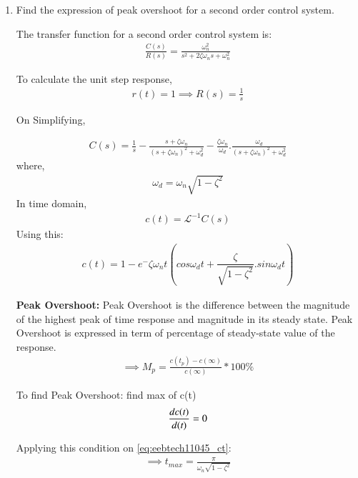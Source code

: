 \begin{enumerate}[label=\thesubsection.\arabic*.,ref=\thesubsection.\theenumi]

\item Find the expression of peak overshoot for a second order control system.

\solution

The transfer function for a second order control system is:
\begin{align}
    \frac{C(s)}{R(s)}= \frac{\omega_n^2}{s^2 + 2\zeta\omega_ns + \omega_n^2}
\end{align}

To calculate the unit step response,
\begin{align}
    r(t) = 1 \implies R(s) = \frac{1}{s}    
\end{align}

On Simplifying, 

\begin{align}
    C(s) = \frac{1}{s}-\frac{s+\zeta\omega_n}{(s + \zeta\omega_n)^2 + \omega_d^2} - \frac{\zeta\omega_n}{\omega_d}.\frac{\omega_d}{(s + \zeta\omega_n)^2 + \omega_d^2}  
\end{align}
where, 
\begin{align}
    \omega_d=\omega_n\sqrt{1-\zeta^2}
\end{align}
In time domain, 
\begin{align}
    c(t) = \mathcal{L}^{-1}{C(s)}
\end{align}
Using this:
\begin{align}
    c(t) = 1 - e^-\zeta\omega_nt(cos\omega_dt+\dfrac{\zeta}{\sqrt{1-\zeta^2}}.sin\omega_dt)
    \label{eq:eebtech11045_ct}
\end{align}

 \textbf{Peak Overshoot:}
 Peak Overshoot is the difference between the magnitude of the highest peak of time response and magnitude in its steady state. Peak Overshoot is expressed in term of percentage of steady-state value of the response.
\begin{align}
    \implies M_p = \frac{c(t_p) - c(\infty)}{c(\infty)} * 100 \%
\end{align}

To find Peak Overshoot: find max of c(t)
\begin{align}
    \frac{dc(\emph{t})}{d(\emph{t})} = 0
\end{align}

Applying this condition on \eqref{eq:eebtech11045_ct}:
\begin{align}
    \implies t_{max} = \frac{\pi}{\omega_n\sqrt{1-\zeta^2}}
\end{align}


\end{enumerate}
